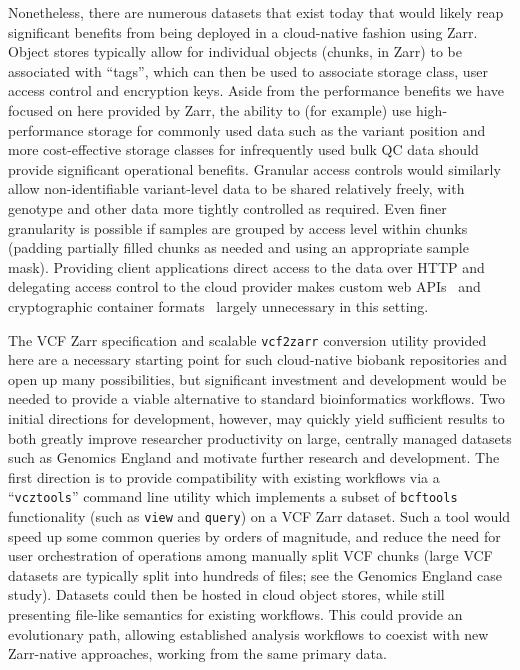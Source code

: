 \documentclass[a4paper,num-refs]{oup-contemporary}
\begin{document}
Nonetheless, there are numerous datasets that exist today
that would likely reap significant benefits from being deployed 
in a cloud-native fashion using Zarr. Object 
stores typically allow for individual objects (chunks, in
Zarr) to be associated with ``tags'', which can then be 
used to associate storage class, user access control
and encryption keys. 
Aside from the performance benefits
we have focused on here provided by Zarr, the ability
to (for example) use high-performance storage for commonly
used data such as the variant position and 
more cost-effective storage classes
for infrequently used bulk QC data should provide 
significant operational benefits.
Granular access controls would similarly allow non-identifiable
variant-level data to be shared relatively freely,
with genotype and other data more tightly controlled
as required.
Even finer granularity is possible if samples are grouped by
access level within chunks (padding partially filled 
chunks as needed and using an appropriate sample mask). 
Providing client applications direct access to 
the data over HTTP
and delegating access control to the cloud provider
makes custom web APIs~\cite{kelleher2019htsget} 
and cryptographic container formats~\citep{senf2021crypt4gh}
largely unnecessary in this setting.

The VCF Zarr specification and scalable \texttt{vcf2zarr} conversion utility
provided here are a necessary starting point for such cloud-native
biobank repositories and open up many possibilities,
but significant investment and development would be needed 
to provide a viable alternative to standard bioinformatics workflows. 
Two initial directions for development, however, may quickly
yield sufficient results to both greatly improve researcher productivity on 
large, centrally managed datasets such as Genomics England
and motivate further research and development.
The first direction is to provide compatibility with existing 
workflows via a ``\texttt{vcztools}'' command line utility which 
implements a subset of \texttt{bcftools} functionality (such as 
\texttt{view} and \texttt{query}) on a VCF Zarr dataset.
Such a tool would speed up some common queries by orders 
of magnitude, and reduce the need for user orchestration of 
operations among manually split VCF chunks (large VCF datasets
are typically split into hundreds of files; see the Genomics
England case study). Datasets could then be hosted in cloud
object stores, while still presenting file-like semantics
for existing workflows. This could provide an evolutionary path,
allowing established analysis workflows to coexist with new Zarr-native
approaches, working from the same primary data.
\end{document}
